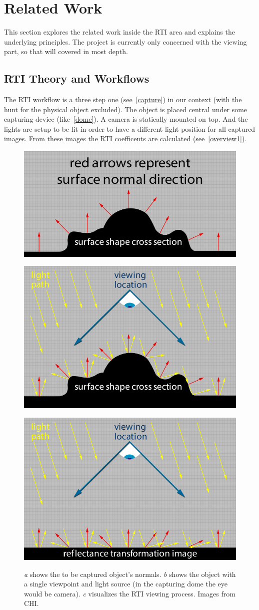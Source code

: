 \section{Related Work}
This section explores the related work inside the RTI area and explains the
underlying principles. The project is currently only concerned with the viewing
part, so that will covered in most depth.

\subsection{RTI Theory and Workflows}

The RTI workflow is a three step one (see~\autoref{capture}) in our context
(with the hunt for the physical object excluded). The object is placed central under
some capturing device (like~\autoref{dome}). A camera is
statically mounted on top. And the lights are setup to be lit in
order to have a different light position for all captured images. From these
images the RTI coefficents are calculated (see~\autoref{overview1}).


\begin{figure}
\begin{subfloat}[]{\includegraphics[max width=0.32\linewidth]{images/normals_01}}\end{subfloat}
\begin{subfloat}[]{\includegraphics[max width=0.32\linewidth]{images/normals_02}}\end{subfloat}
\begin{subfloat}[]{\includegraphics[max width=0.32\linewidth]{images/normals_03}}\end{subfloat}
\caption[RTI Overview]{\emph{a} shows the to be captured object's normals.
  \emph{b} shows the object with a single viewpoint and light source (in the
  capturing dome the eye would be camera). \emph{c} visualizes the RTI viewing
  process. Images from CHI\cite*{noauthor_cultural_nodate}.}
\label{overview1}
\end{figure}






